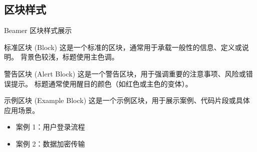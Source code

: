 \subsection{区块样式}
\begin{frame}{Beamer 区块样式展示}
    \begin{block}{标准区块 (Block)}
        这是一个标准的区块，通常用于承载一般性的信息、定义或说明。
        背景色较浅，标题使用主色调。
    \end{block}

    \begin{alertblock}{警告区块 (Alert Block)}
        这是一个警告区块，用于强调重要的注意事项、风险或错误提示。
        标题通常使用醒目的颜色（如红色或主色的变体）。
    \end{alertblock}

    \begin{exampleblock}{示例区块 (Example Block)}
        这是一个示例区块，用于展示案例、代码片段或具体应用场景。
        \begin{itemize}
            \item 案例 1：用户登录流程
            \item 案例 2：数据加密传输
        \end{itemize}
    \end{exampleblock}
\end{frame}

